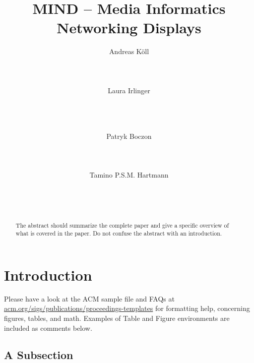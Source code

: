 \documentclass{acm_proc_article-sp}
\begin{document}
\title{MIND – Media Informatics Networking Displays}

\author{
\alignauthor
Andreas Köll\\
       \\
       \\
       \\
\alignauthor
Laura Irlinger\\
       \\
       \\
       \\
\and
\alignauthor
Patryk Boczon\\
       \\
       \\
       \\
\alignauthor
Tamino P.S.M. Hartmann\\
       \\
       \\
       \\
}

\maketitle
\begin{abstract}
The abstract should summarize the complete paper and give a specific overview of what is covered in the paper. Do not confuse the abstract with an introduction.
\end{abstract}

\section{Introduction}
Please have a look at the ACM sample file and FAQs at \url{acm.org/sigs/publications/proceedings-templates} for formatting help, concerning figures, tables, and math. Examples of Table and Figure environments are included as comments below.

\subsection{A Subsection}
\end{document}
